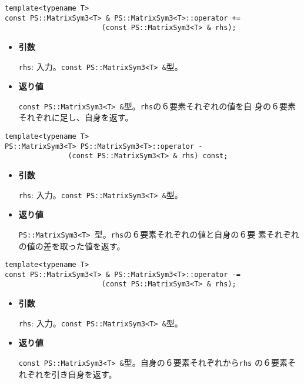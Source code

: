 \begin{screen}
\begin{verbatim}
template<typename T>
const PS::MatrixSym3<T> & PS::MatrixSym3<T>::operator += 
                       (const PS::MatrixSym3<T> & rhs);
\end{verbatim}
\end{screen}

\begin{itemize}

\item{{\bf 引数}}

{\tt rhs}: 入力。{\tt const PS::MatrixSym3<T> \&}型。

\item{{\bf 返り値}}

{\tt const PS::MatrixSym3<T> \&}型。{\tt rhs}の６要素それぞれの値を自
身の６要素それぞれに足し、自身を返す。

\end{itemize}

\begin{screen}
\begin{verbatim}
template<typename T>
PS::MatrixSym3<T> PS::MatrixSym3<T>::operator - 
               (const PS::MatrixSym3<T> & rhs) const;
\end{verbatim}
\end{screen}

\begin{itemize}

\item{{\bf 引数}}

{\tt rhs}: 入力。{\tt const PS::MatrixSym3<T> \&}型。

\item{{\bf 返り値}}

{\tt PS::MatrixSym3<T> }型。{\tt rhs}の６要素それぞれの値と自身の６要
素それぞれの値の差を取った値を返す。

\end{itemize}

\begin{screen}
\begin{verbatim}
template<typename T>
const PS::MatrixSym3<T> & PS::MatrixSym3<T>::operator -= 
                       (const PS::MatrixSym3<T> & rhs);
\end{verbatim}
\end{screen}

\begin{itemize}

\item{{\bf 引数}}

{\tt rhs}: 入力。{\tt const PS::MatrixSym3<T> \&}型。

\item{{\bf 返り値}}

{\tt const PS::MatrixSym3<T> \&}型。自身の６要素それぞれから{\tt rhs}
の６要素それぞれを引き自身を返す。

\end{itemize}

